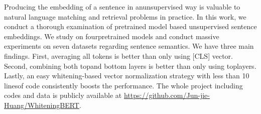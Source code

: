 Producing the embedding of a sentence in anunsupervised way is valuable to natural language matching and retrieval problems in practice. In this work, we conduct a thorough examination of pretrained model based unsupervised sentence embeddings. We study on fourpretrained models and conduct massive experiments on seven datasets regarding sentence semantics. We have three main findings. First, averaging all tokens is better than only using [CLS] vector. Second, combining both topand bottom layers is better than only using toplayers. Lastly, an easy whitening-based vector normalization strategy with less than 10 linesof code consistently boosts the performance. The whole project including codes and data is publicly available at \url{https://github.com/Jun-jie-Huang/WhiteningBERT}.
